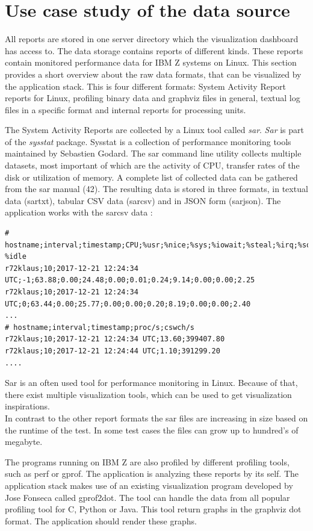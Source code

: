 \documentclass[american,a4paper,oneside,,tablecaptionabove]{scrbook}
\begin{document}
\section{Use case study of the data source}\label{sec:usecase-dat}

All reports are stored in one server directory which the visualization
dashboard has access to. The data storage contains reports of different
kinds. These reports contain monitored performance data for IBM Z
systems on Linux. This section provides a short overview about the raw
data formats, that can be visualized by the application stack. This is
four different formats: System Activity Report reports for Linux,
profiling binary data and graphviz files in general, textual log files
in a specific format and internal reports for processing units.

The System Activity Reports are collected by a Linux tool called
\emph{sar}. \emph{Sar} is part of the \emph{sysstat} package. Sysstat is
a collection of performance monitoring tools maintained by Sebastien
Godard. The sar command line utility collects multiple datasets, most
important of which are the activity of CPU, transfer rates of the disk
or utilization of memory. A complete list of collected data can be
gathered from the sar manual (42). The resulting data is stored in three
formats, in textual data (sartxt), tabular CSV data (sarcsv) and in JSON
form (sarjson). The application works with the sarcsv data :

\begin{lstlisting}[caption={Sysstat report - sarcsv file}]
# hostname;interval;timestamp;CPU;%usr;%nice;%sys;%iowait;%steal;%irq;%soft;%guest;%gnice; %idle
r72klaus;10;2017-12-21 12:24:34 UTC;-1;63.88;0.00;24.48;0.00;0.01;0.24;9.14;0.00;0.00;2.25
r72klaus;10;2017-12-21 12:24:34 UTC;0;63.44;0.00;25.77;0.00;0.00;0.20;8.19;0.00;0.00;2.40
...
# hostname;interval;timestamp;proc/s;cswch/s
r72klaus;10;2017-12-21 12:24:34 UTC;13.60;399407.80
r72klaus;10;2017-12-21 12:24:44 UTC;1.10;391299.20
....
\end{lstlisting}

Sar is an often used tool for performance monitoring in Linux. Because
of that, there exist multiple visualization tools, which can be used to
get visualization inspirations.\\
In contrast to the other report formats the sar files are increasing in
size based on the runtime of the test. In some test cases the files can
grow up to hundred's of megabyte.

The programs running on IBM Z are also profiled by different profiling
tools, such as perf or gprof. The application is analyzing these reports
by its self. The application stack makes use of an existing
visualization program developed by Jose Fonseca called gprof2dot. The
tool can handle the data from all popular profiling tool for C, Python
or Java. This tool return graphs in the graphviz dot format. The
application should render these graphs.
\end{document}
